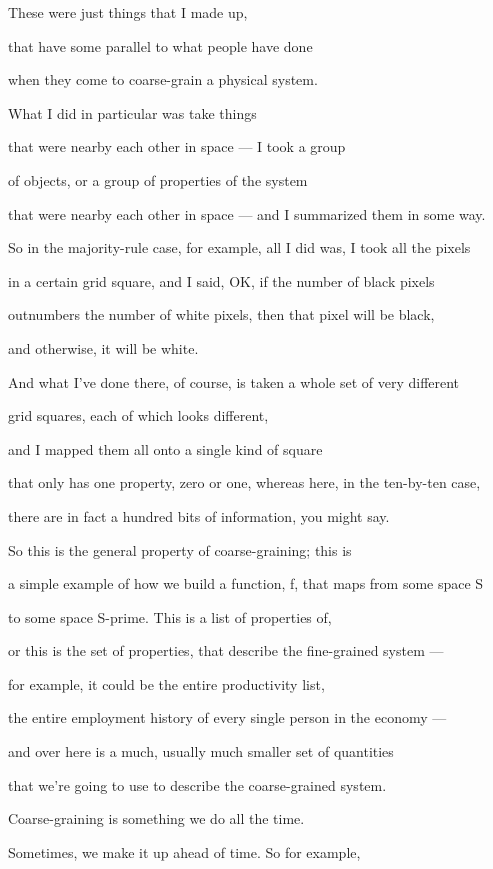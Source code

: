 \documentclass[]{article}
\begin{document}
These were just things that
I made up,

that have some parallel
to what people have done

when they come to coarse-grain
a physical system.

What I did in particular
was take things

that were nearby each other in space
--- I took a group

of objects, or a group of properties
of the system

that were nearby each other in space ---
and I summarized them in some way.

So in the majority-rule case, for example,
all I did was, I took all the pixels

in a certain grid square, and I said, OK,
if the number of black pixels

outnumbers the number of white pixels,
then that pixel will be black,

and otherwise, it will be white.

And what I've done there, of course,
is taken a whole set of very different

grid squares, each of which
looks different,

and I mapped them all onto a single
kind of square

that only has one property, zero or one,
whereas here, in the ten-by-ten case,

there are in fact a hundred bits
of information, you might say.

So this is the general property
of coarse-graining; this is

a simple example of how we build
a function, f, that maps from some space S

to some space S-prime.
This is a list of properties of,

or this is the set of properties,
that describe the fine-grained system ---

for example, it could be the entire
productivity list,

the entire employment history
of every single person in the economy ---

and over here is a much,
usually much smaller set of quantities

that we're going to use to describe
the coarse-grained system.

Coarse-graining is something we do
all the time.

Sometimes, we make it up ahead of time.
So for example,
\end{document}
